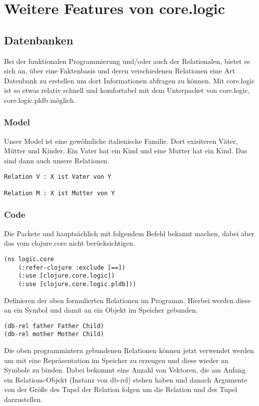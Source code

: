 \section{Weitere Features von core.logic} \label{sec:features}

\subsection{Datenbanken}

Bei der funktionalen Programmierung und/oder auch der Relationalen, bietet es sich an, über eine Faktenbasis und deren verschiedenen Relationen eine Art Datenbank zu erstellen um dort Informationen abfragen zu können. Mit core.logic ist so etwas relativ schnell und komfortabel mit dem Unterpacket von core.logic, core.logic.pldb möglich.

\subsubsection{Model}

Unser Model ist eine gewöhnliche italienische Familie. Dort exisiteren Väter, Mütter und Kinder. Ein Vater hat ein Kind und eine Mutter hat ein Kind. Das sind dann auch unsere Relationen.

\begin{lstlisting}
Relation V : X ist Vater von Y

Relation M : X ist Mutter von Y
\end{lstlisting}

\subsubsection{Code}

Die Packete  und hauptsächlich  mit folgendem Befehl bekannt machen, dabei aber das \code{==} vom clojure.core nicht berücksichtigen.

\begin{lstlisting}
(ns logic.core	
	(:refer-clojure :exclude [==])
	(:use [clojure.core.logic])
  	(:use [clojure.core.logic.pldb]))
\end{lstlisting}
Definieren der oben formulierten Relationen im Programm. Hierbei werden diese an ein Symbol und damit an ein Objekt im Speicher gebunden.

\begin{lstlisting}
(db-rel father Father Child)
(db-rel mother Mother Child)
\end{lstlisting}
Die oben programmintern gebundenen Relationen können jetzt verwendet werden um mit  eine Repräsentation im Speicher zu erzeugen und diese wieder an Symbole zu binden. Dabei bekommt  eine Anzahl von Vektoren, die am Anfang ein Relations-Objekt (\dq{}Instanz\dq{} von db-rel) stehen haben und danach Argumente von der Größe des Tupel der Relation folgen um die Relation und des Tupel darzustellen.

